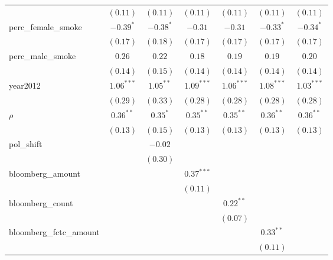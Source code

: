\begin{table}[!h]
\begin{center}
\begin{tabular}{l c c c c c c }
                        & $(0.11)$     & $(0.11)$    & $(0.11)$     & $(0.11)$     & $(0.11)$     & $(0.11)$     \\
perc\_female\_smoke     & $-0.39^{*}$  & $-0.38^{*}$ & $-0.31$      & $-0.31$      & $-0.33^{*}$  & $-0.34^{*}$  \\
                        & $(0.17)$     & $(0.18)$    & $(0.17)$     & $(0.17)$     & $(0.17)$     & $(0.17)$     \\
perc\_male\_smoke       & $0.26$       & $0.22$      & $0.18$       & $0.19$       & $0.19$       & $0.20$       \\
                        & $(0.14)$     & $(0.15)$    & $(0.14)$     & $(0.14)$     & $(0.14)$     & $(0.14)$     \\
year2012                & $1.06^{***}$ & $1.05^{**}$ & $1.09^{***}$ & $1.06^{***}$ & $1.08^{***}$ & $1.03^{***}$ \\
                        & $(0.29)$     & $(0.33)$    & $(0.28)$     & $(0.28)$     & $(0.28)$     & $(0.28)$     \\
$\rho$                  & $0.36^{**}$  & $0.35^{*}$  & $0.35^{**}$  & $0.35^{**}$  & $0.36^{**}$  & $0.36^{**}$  \\
                        & $(0.13)$     & $(0.15)$    & $(0.13)$     & $(0.13)$     & $(0.13)$     & $(0.13)$     \\
pol\_shift              &              & $-0.02$     &              &              &              &              \\
                        &              & $(0.30)$    &              &              &              &              \\
bloomberg\_amount       &              &             & $0.37^{***}$ &              &              &              \\
                        &              &             & $(0.11)$     &              &              &              \\
bloomberg\_count        &              &             &              & $0.22^{**}$  &              &              \\
                        &              &             &              & $(0.07)$     &              &              \\
bloomberg\_fctc\_amount &              &             &              &              & $0.33^{**}$  &              \\
                        &              &             &              &              & $(0.11)$     &              \\

\end{tabular}
\end{center}
\end{table}
